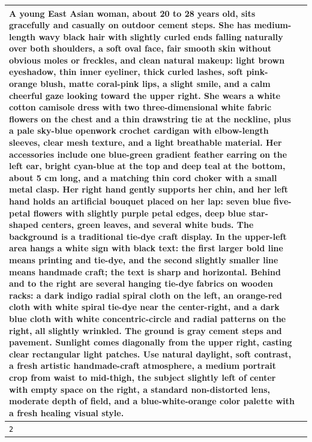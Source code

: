 \documentclass{article}
\begin{document}
\begin{table}[t]
{\begin{tabular}{p{}p{}}
A young East Asian woman, about 20 to 28 years old, sits gracefully and casually on outdoor cement steps. She has medium-length wavy black hair with slightly curled ends falling naturally over both shoulders, a soft oval face, fair smooth skin without obvious moles or freckles, and clean natural makeup: light brown eyeshadow, thin inner eyeliner, thick curled lashes, soft pink-orange blush, matte coral-pink lips, a slight smile, and a calm cheerful gaze looking toward the upper right. She wears a white cotton camisole dress with two three-dimensional white fabric flowers on the chest and a thin drawstring tie at the neckline, plus a pale sky-blue openwork crochet cardigan with elbow-length sleeves, clear mesh texture, and a light breathable material. Her accessories include one blue-green gradient feather earring on the left ear, bright cyan-blue at the top and deep teal at the bottom, about 5 cm long, and a matching thin cord choker with a small metal clasp. Her right hand gently supports her chin, and her left hand holds an artificial bouquet placed on her lap: seven blue five-petal flowers with slightly purple petal edges, deep blue star-shaped centers, green leaves, and several white buds. The background is a traditional tie-dye craft display. In the upper-left area hangs a white sign with black text: the first larger bold line means printing and tie-dye, and the second slightly smaller line means handmade craft; the text is sharp and horizontal. Behind and to the right are several hanging tie-dye fabrics on wooden racks: a dark indigo radial spiral cloth on the left, an orange-red cloth with white spiral tie-dye near the center-right, and a dark blue cloth with white concentric-circle and radial patterns on the right, all slightly wrinkled. The ground is gray cement steps and pavement. Sunlight comes diagonally from the upper right, casting clear rectangular light patches. Use natural daylight, soft contrast, a fresh artistic handmade-craft atmosphere, a medium portrait crop from waist to mid-thigh, the subject slightly left of center with empty space on the right, a standard non-distorted lens, moderate depth of field, and a blue-white-orange color palette with a fresh healing visual style. \\
\midrule
\texttt{2} &

\end{tabular}}
\end{table}
\end{document}

